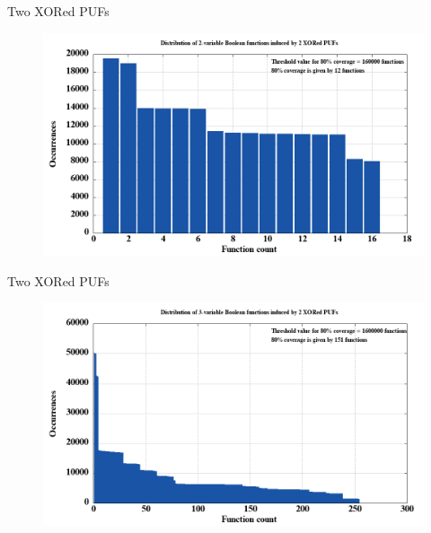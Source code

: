 \documentclass[10pt, compress]{beamer}
\begin{document}
\begin{frame}{Two XORed PUFs}
    \begin{figure}
        \centering
        \includegraphics[width=\textwidth]{figures/sorted/distribution_of_2-variable_boolean_functions_induced_by_2_xored_pufs.png}
    \end{figure}
\end{frame}

\begin{frame}{Two XORed PUFs}
    \begin{figure}
        \centering
        \includegraphics[width=\textwidth]{figures/sorted/distribution_of_3-variable_boolean_functions_induced_by_2_xored_pufs.png}
    \end{figure}
\end{frame}
\end{document}
